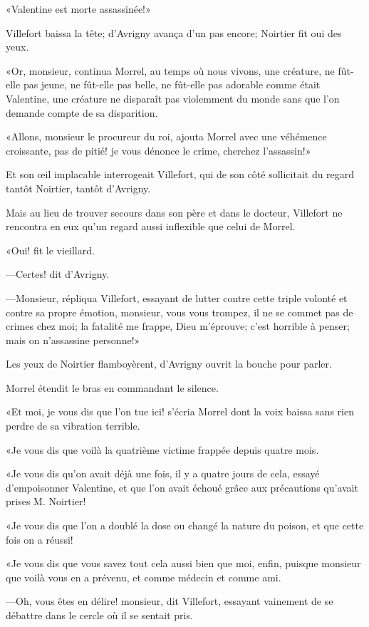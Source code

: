 «Valentine est morte assassinée!» 

Villefort baissa la tête; d'Avrigny avança d'un pas encore; Noirtier fit oui des yeux. 

«Or, monsieur, continua Morrel, au temps où nous vivons, une créature, ne fût-elle pas jeune, ne fût-elle pas belle, ne fût-elle pas adorable comme était Valentine, une créature ne disparaît pas violemment du monde sans que l'on demande compte de sa disparition. 

«Allons, monsieur le procureur du roi, ajouta Morrel avec une véhémence croissante, pas de pitié! je vous dénonce le crime, cherchez l'assassin!» 

Et son œil implacable interrogeait Villefort, qui de son côté sollicitait du regard tantôt Noirtier, tantôt d'Avrigny. 

Mais au lieu de trouver secours dans son père et dans le docteur, Villefort ne rencontra en eux qu'un regard aussi inflexible que celui de Morrel. 

«Oui! fit le vieillard. 

—Certes! dit d'Avrigny. 

—Monsieur, répliqua Villefort, essayant de lutter contre cette triple volonté et contre sa propre émotion, monsieur, vous vous trompez, il ne se commet pas de crimes chez moi; la fatalité me frappe, Dieu m'éprouve; c'est horrible à penser; mais on n'assassine personne!» 

Les yeux de Noirtier flamboyèrent, d'Avrigny ouvrit la bouche pour parler. 

Morrel étendit le bras en commandant le silence. 

«Et moi, je vous dis que l'on tue ici! s'écria Morrel dont la voix baissa sans rien perdre de sa vibration terrible. 

«Je vous dis que voilà la quatrième victime frappée depuis quatre mois. 

«Je vous dis qu'on avait déjà une fois, il y a quatre jours de cela, essayé d'empoisonner Valentine, et que l'on avait échoué grâce aux précautions qu'avait prises M. Noirtier! 

«Je vous dis que l'on a doublé la dose ou changé la nature du poison, et que cette fois on a réussi! 

«Je vous dis que vous savez tout cela aussi bien que moi, enfin, puisque monsieur que voilà vous en a prévenu, et comme médecin et comme ami. 

—Oh, vous êtes en délire! monsieur, dit Villefort, essayant vainement de se débattre dans le cercle où il se sentait pris. 

